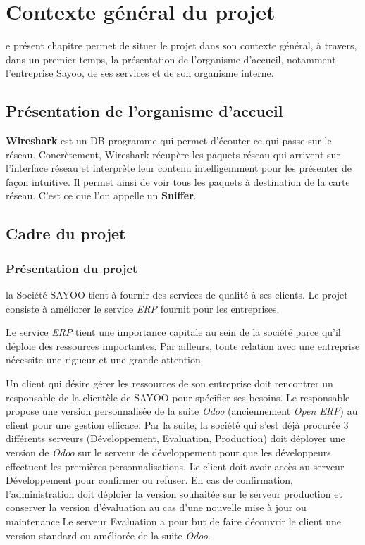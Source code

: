 \chapter{Contexte général du projet}
\begin{onehalfspace}

 e présent chapitre permet de situer le projet dans son contexte général, à travers, dans un premier temps, la présentation de l'organisme d'accueil, notamment l'entreprise Sayoo, de ses services et de son organisme interne.

\newpage


\section{Présentation de l'organisme d'accueil}

\textbf{Wireshark} est un DB programme qui permet d'écouter ce qui passe sur le réseau. Concrètement, Wireshark récupère les paquets réseau qui arrivent sur l'interface réseau et interprète leur contenu intelligemment pour les présenter de façon intuitive. Il permet ainsi de voir tous les paquets à destination de la carte réseau. C'est ce que l'on appelle un \textbf{Sniffer}.


\section{Cadre du projet}


\subsection{Présentation du projet}
 
la Société SAYOO tient à fournir des services de qualité à ses clients. Le projet consiste à améliorer le service \emph{ERP} fournit pour les entreprises.

Le service \emph{ERP} tient une importance capitale au sein de la société parce qu'il déploie des ressources importantes. Par ailleurs, toute relation avec une entreprise nécessite une rigueur et une grande attention.

Un client qui désire gérer les ressources de son entreprise  doit rencontrer un responsable de la clientèle de SAYOO pour spécifier ses besoins. Le responsable propose une version personnalisée de la suite \emph{Odoo} (anciennement \emph{Open ERP}) au client pour une gestion efficace. Par la suite, la société qui s'est déjà procurée  3 différents serveurs (Développement, Evaluation, Production) doit déployer une version de \emph{Odoo} sur le serveur de développement pour que les développeurs effectuent les premières personnalisations. Le client doit avoir accès au serveur Développement pour confirmer ou refuser. En cas de confirmation, l'administration doit déploier la version souhaitée sur le serveur production et conserver la version d'évaluation au cas d'une nouvelle mise à jour ou maintenance.Le serveur Evaluation a pour but de faire découvrir le client une version standard ou améliorée de la suite \emph{Odoo}.  


\end{onehalfspace}
